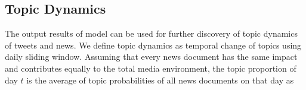 






\subsection{Topic Dynamics}
The output results of \stlda model can be used for further discovery of topic dynamics of tweets and news. We define topic dynamics as temporal change of topics using daily sliding window. Assuming that every news document has the same impact and contributes equally to the total media environment, the topic proportion of day $t$ is the average of topic probabilities of all news documents on that day as

